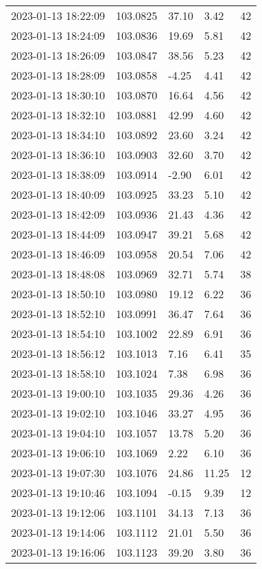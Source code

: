 \documentclass{nature_plusfigure}
\begin{document}
\begin{supplement}
\begin{center}
\begin{longtable}{lllll}
2023-01-13 18:22:09 & 103.0825 & 37.10 & 3.42 & 42 \\ 
2023-01-13 18:24:09 & 103.0836 & 19.69 & 5.81 & 42 \\ 
2023-01-13 18:26:09 & 103.0847 & 38.56 & 5.23 & 42 \\ 
2023-01-13 18:28:09 & 103.0858 & -4.25 & 4.41 & 42 \\ 
2023-01-13 18:30:10 & 103.0870 & 16.64 & 4.56 & 42 \\ 
2023-01-13 18:32:10 & 103.0881 & 42.99 & 4.60 & 42 \\ 
2023-01-13 18:34:10 & 103.0892 & 23.60 & 3.24 & 42 \\ 
2023-01-13 18:36:10 & 103.0903 & 32.60 & 3.70 & 42 \\ 
2023-01-13 18:38:09 & 103.0914 & -2.90 & 6.01 & 42 \\ 
2023-01-13 18:40:09 & 103.0925 & 33.23 & 5.10 & 42 \\ 
2023-01-13 18:42:09 & 103.0936 & 21.43 & 4.36 & 42 \\ 
2023-01-13 18:44:09 & 103.0947 & 39.21 & 5.68 & 42 \\ 
2023-01-13 18:46:09 & 103.0958 & 20.54 & 7.06 & 42 \\ 
2023-01-13 18:48:08 & 103.0969 & 32.71 & 5.74 & 38 \\ 
2023-01-13 18:50:10 & 103.0980 & 19.12 & 6.22 & 36 \\ 
2023-01-13 18:52:10 & 103.0991 & 36.47 & 7.64 & 36 \\ 
2023-01-13 18:54:10 & 103.1002 & 22.89 & 6.91 & 36 \\ 
2023-01-13 18:56:12 & 103.1013 & 7.16 & 6.41 & 35 \\ 
2023-01-13 18:58:10 & 103.1024 & 7.38 & 6.98 & 36 \\ 
2023-01-13 19:00:10 & 103.1035 & 29.36 & 4.26 & 36 \\ 
2023-01-13 19:02:10 & 103.1046 & 33.27 & 4.95 & 36 \\ 
2023-01-13 19:04:10 & 103.1057 & 13.78 & 5.20 & 36 \\ 
2023-01-13 19:06:10 & 103.1069 & 2.22 & 6.10 & 36 \\ 
2023-01-13 19:07:30 & 103.1076 & 24.86 & 11.25 & 12 \\ 
2023-01-13 19:10:46 & 103.1094 & -0.15 & 9.39 & 12 \\ 
2023-01-13 19:12:06 & 103.1101 & 34.13 & 7.13 & 36 \\ 
2023-01-13 19:14:06 & 103.1112 & 21.01 & 5.50 & 36 \\ 
2023-01-13 19:16:06 & 103.1123 & 39.20 & 3.80 & 36 \\ 

\end{longtable}
\end{center}
\end{supplement}
\end{document}
